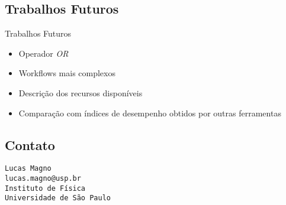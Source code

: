 \documentclass[xcolor=x11names,compress]{beamer}
\renewcommand{\(}{\begin{columns}}
\renewcommand{\)}{\end{columns}}
\newcommand{\<}[1]{\begin{column}{#1}}
\renewcommand{\>}{\end{column}}
\begin{document}
    \subsection{Trabalhos Futuros}
        \begin{frame}{Trabalhos Futuros}
            \begin{itemize}[<+->]
                \item Operador \emph{OR}
                \item Workflows mais complexos
                \item Descrição dos recursos disponíveis
                \item Comparação com índices de desempenho obtidos por outras ferramentas
            \end{itemize}
        \end{frame}

    \subsection{Contato}
        \begin{frame}{}
            \vspace{3.5cm}
            \texttt{Lucas Magno\\
            lucas.magno@usp.br\\
            Instituto de Física\\
            Universidade de São Paulo}
        \end{frame}
\end{document}

